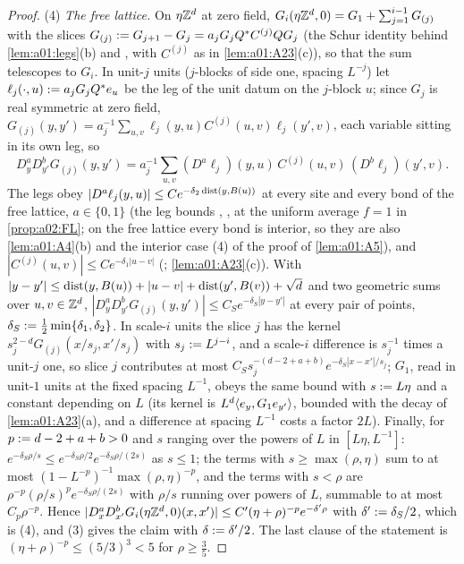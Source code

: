 \begin{proof}
(4) \emph{The free lattice.} On $\eta\mathbb Z^d$ at zero field, $G_i(\eta\mathbb Z^d,0)=G_1+\sum_{j=1}^{i-1}G_{(j)}$ with the slices $G_{(j)}:= G_{j+1}-G_j=a_jG_jQ^*C^{(j)}QG_j$ (the Schur identity behind \cref{lem:a01:legs}(b) and \cite[(2.17)]{K1}, with $C^{(j)}$ as in \cref{lem:a01:A23}(c)), so that the sum telescopes to $G_i$. In unit-$j$ units ($j$-blocks of side one, spacing $L^{-j}$) let $\ell_j(\cdot,u):= a_jG_jQ^*e_u$ be the leg of the unit datum on the $j$-block $u$; since $G_j$ is real symmetric at zero field, $G_{(j)}(y,y')=a_j^{-1}\sum_{u,v}\ell_j(y,u)C^{(j)}(u,v)\ell_j(y',v)$, each variable sitting in its own leg, so
\[
D^a_yD^b_{y'}G_{(j)}(y,y')=a_j^{-1}\sum_{u,v}(D^a\ell_j)(y,u)\,C^{(j)}(u,v)\,(D^b\ell_j)(y',v).
\]
The legs obey $|D^a\ell_j(y,u)|\le Ce^{-\delta_2\operatorname{dist}(y,B(u))}$ at every site and every bond of the free lattice, $a\in\{0,1\}$ (the leg bounds \cite[(3.64)]{K1}, \cite[(2.12)]{Ba3}, at the uniform average $f=1$ in \cref{prop:a02:FL}; on the free lattice every bond is interior, so they are also \cref{lem:a01:A4}(b) and the interior case (4) of the proof of \cref{lem:a01:A5}), and $|C^{(j)}(u,v)|\le Ce^{-\delta_1|u-v|}$ (\cite[Thm.~3.3, (3.6)]{K1}; \cref{lem:a01:A23}(c)). With $|y-y'|\le\operatorname{dist}(y,B(u))+|u-v|+\operatorname{dist}(y',B(v))+\sqrt d$ and two geometric sums over $u,v\in\mathbb Z^d$, $|D^a_yD^b_{y'}G_{(j)}(y,y')|\le C_Se^{-\delta_S|y-y'|}$ at every pair of points, $\delta_S:=\frac12\min\{\delta_1,\delta_2\}$. In scale-$i$ units the slice $j$ has the kernel $s_j^{2-d}G_{(j)}(x/s_j,x'/s_j)$ with $s_j:= L^{j-i}$, and a scale-$i$ difference is $s_j^{-1}$ times a unit-$j$ one, so slice $j$ contributes at most $C_Ss_j^{-(d-2+a+b)}e^{-\delta_S|x-x'|/s_j}$; $G_1$, read in unit-$1$ units at the fixed spacing $L^{-1}$, obeys the same bound with $s:= L\eta$ and a constant depending on $L$ (its kernel is $L^d\langle e_y,G_1e_{y'}\rangle$, bounded with the decay of \cref{lem:a01:A23}(a), and a difference at spacing $L^{-1}$ costs a factor $2L$). Finally, for $p:= d-2+a+b>0$ and $s$ ranging over the powers of $L$ in $[L\eta,L^{-1}]$: $e^{-\delta_S\rho/s}\le e^{-\delta_S\rho/2}e^{-\delta_S\rho/(2s)}$ as $s\le1$; the terms with $s\ge\max(\rho,\eta)$ sum to at most $(1-L^{-p})^{-1}\max(\rho,\eta)^{-p}$, and the terms with $s<\rho$ are $\rho^{-p}(\rho/s)^pe^{-\delta_S\rho/(2s)}$ with $\rho/s$ running over powers of $L$, summable to at most $C_p\rho^{-p}$. Hence $|D^a_xD^b_{x'}G_i(\eta\mathbb Z^d,0)(x,x')|\le C'(\eta+\rho)^{-p}e^{-\delta'\rho}$ with $\delta':=\delta_S/2$, which is (4), and (3) gives the claim with $\delta:=\delta'/2$. The last clause of the statement is $(\eta+\rho)^{-p}\le(5/3)^3<5$ for $\rho\ge\frac35$.


\end{proof}
